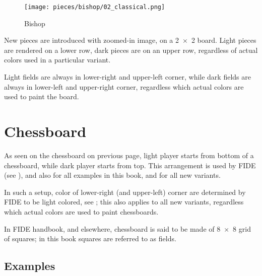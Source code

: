 \noindent
\begin{wrapfigure}[12]{l}{0.4\textwidth}
\centering
\texttt{[image: pieces/bishop/02\_classical.png]}
\caption{Bishop}
\label{fig:bishop/02_classical}
\end{wrapfigure}
New pieces are introduced with zoomed-in image, on a \mbox{2 $\times$ 2} board.
Light pieces are rendered on a lower row, dark pieces are on an upper row,
regardless of actual colors used in a particular variant. %

Light fields are always in lower-right and upper-left corner, while dark fields
are always in lower-left and upper-right corner, regardless which actual colors
are used to paint the board.


\section*{Chessboard}
\label{sec:Classical Chess/Chessboard}

As seen on the chessboard on previous page, light player starts from bottom of
a chessboard, while dark player starts from top. This arrangement is used by FIDE
(see ), and also for all examples in this book, and for all new
variants.

In such a setup, color of lower-right (and upper-left) corner are determined by
FIDE to be light colored, see ; this also applies to all new
variants, regardless which actual colors are used to paint chessboards.

In FIDE handbook, and elsewhere, chessboard is said to be made of \mbox{8 $\times$ 8}
grid of squares; in this book squares are referred to as fields.

\clearpage %

\subsection*{Examples}
\label{sec:Classical Chess/Chessboard/Examples}

